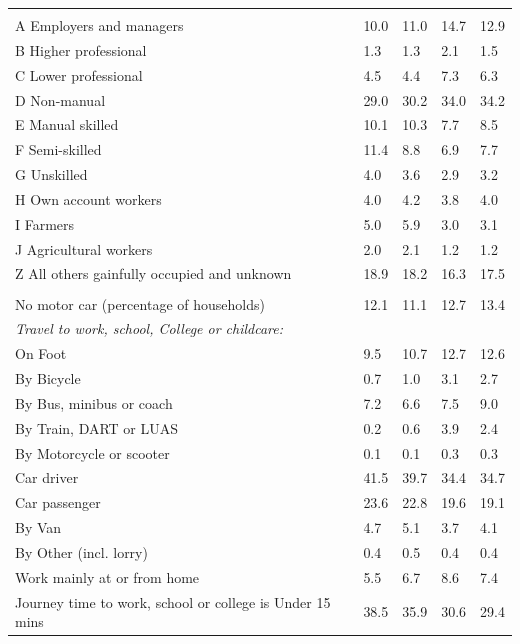 \documentclass{article}
\begin{document}
\begin{table}[h]
\begin{tabular}{KTTTT}
\hline
    \\ 
    \hline
A Employers and managers & 10.0& 11.0& 14.7& 12.9\\
B Higher professional & 1.3& 1.3& 2.1& 1.5\\
C Lower professional & 4.5& 4.4& 7.3& 6.3\\
D Non-manual & 29.0& 30.2& 34.0& 34.2\\
E Manual skilled & 10.1& 10.3&  7.7&  8.5\\
F Semi-skilled & 11.4&  8.8&  6.9&  7.7\\
G Unskilled & 4.0& 3.6& 2.9& 3.2\\
H Own account workers & 4.0& 4.2& 3.8& 4.0\\
I Farmers & 5.0& 5.9& 3.0& 3.1\\
J Agricultural workers & 2.0& 2.1& 1.2& 1.2\\
Z All others gainfully occupied and unknown & 18.9& 18.2& 16.3& 17.5\\
\hline
{}\hline
    \\ 
    \hline
No motor car (percentage of households) & 12.1& 11.1& 12.7& 
13.4\\
    \hline 
\emph{Travel to work, school, College or childcare:} & & & \\
\quad On Foot &  9.5& 10.7& 12.7& 12.6\\ 
\quad By Bicycle & 0.7& 1.0& 3.1& 2.7\\ 
\quad By Bus, minibus or coach & 7.2& 6.6& 7.5& 9.0\\
\quad By Train, DART or LUAS & 0.2& 0.6& 3.9& 2.4\\
\quad By Motorcycle or scooter & 0.1& 0.1& 0.3& 0.3\\
\quad Car driver & 41.5 & 39.7& 34.4& 34.7\\
\quad Car passenger & 23.6& 22.8& 19.6& 19.1\\
\quad By Van & 4.7& 5.1& 3.7& 4.1\\
\quad By Other (incl. lorry) & 0.4& 0.5& 0.4& 0.4\\
    \hline
Work mainly at or from home & 5.5& 6.7& 8.6& 7.4\\
Journey time to work, school or college is Under 15 mins & 38.5& 35.9& 30.6& 29.4\\

\end{tabular}
\end{table}
\end{document}
